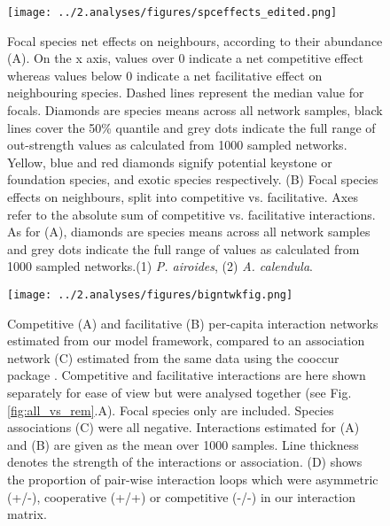 \documentclass[a4,12pt]{article}
\begin{document}
    \begin{figure}[H]
        \begin{centering}
        \texttt{[image: ../2.analyses/figures/spceffects\_edited.png]}
        \caption{Focal species net effects on neighbours, according to their abundance (A). On the x axis, values over 0 indicate a net competitive effect whereas values below 0 indicate a net facilitative effect on neighbouring species. Dashed lines represent the median value for focals. Diamonds are species means across all network samples, black lines cover the 50\% quantile and grey dots indicate the full range of out-strength values as calculated from 1000 sampled networks. Yellow, blue and red diamonds signify potential keystone or foundation species, and exotic species respectively. (B) Focal species effects on neighbours, split into competitive vs. facilitative. Axes refer to the absolute sum of competitive vs. facilitative interactions. As for (A), diamonds are species means across all network samples and grey dots indicate the full range of  values as calculated from 1000 sampled networks.(1) \textit{P. airoides}, (2) \textit{A. calendula}.}
        \label{fig:species}
        \end{centering}
    \end{figure} 





    \newpage

    \begin{figure}[H]
    	\begin{centering}
        \texttt{[image: ../2.analyses/figures/bigntwkfig.png]}
        \caption{Competitive (A) and facilitative (B) per-capita interaction networks estimated from our model framework, compared to an association network (C) estimated from the same data using the cooccur package \parencite{Griffith2016}. Competitive and facilitative interactions are here shown separately for ease of view but were analysed together (see Fig. \ref{fig:all_vs_rem}.A). Focal species only are included. Species associations (C) were all negative.  Interactions estimated for (A) and (B) are given as the mean over 1000 samples. Line thickness denotes the strength of the interactions or association. (D) shows the proportion of pair-wise interaction loops which were asymmetric (+/-), cooperative (+/+) or competitive (-/-) in our interaction matrix.}
        \label{fig:netwks}
       \end{centering}
    \end{figure}    
\end{document}
